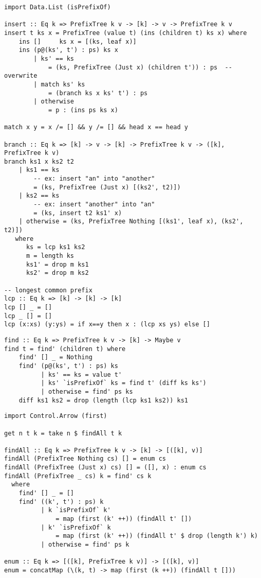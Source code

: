 \documentclass{article}
\begin{document}
\lstset{language=Haskell}
\begin{lstlisting}[caption=Prefix tree insertion]
import Data.List (isPrefixOf)

insert :: Eq k => PrefixTree k v -> [k] -> v -> PrefixTree k v
insert t ks x = PrefixTree (value t) (ins (children t) ks x) where
    ins []     ks x = [(ks, leaf x)]
    ins (p@(ks', t') : ps) ks x
        | ks' == ks
            = (ks, PrefixTree (Just x) (children t')) : ps  -- overwrite
        | match ks' ks
            = (branch ks x ks' t') : ps
        | otherwise
            = p : (ins ps ks x)

match x y = x /= [] && y /= [] && head x == head y

branch :: Eq k => [k] -> v -> [k] -> PrefixTree k v -> ([k], PrefixTree k v)
branch ks1 x ks2 t2
    | ks1 == ks
        -- ex: insert "an" into "another"
        = (ks, PrefixTree (Just x) [(ks2', t2)])
    | ks2 == ks
        -- ex: insert "another" into "an"
        = (ks, insert t2 ks1' x)
    | otherwise = (ks, PrefixTree Nothing [(ks1', leaf x), (ks2', t2)])
   where
      ks = lcp ks1 ks2
      m = length ks
      ks1' = drop m ks1
      ks2' = drop m ks2

-- longest common prefix
lcp :: Eq k => [k] -> [k] -> [k]
lcp [] _ = []
lcp _ [] = []
lcp (x:xs) (y:ys) = if x==y then x : (lcp xs ys) else []
\end{lstlisting}

\lstset{language=Haskell}
\begin{lstlisting}[caption=Alphabetic prefix tree lookup]
find :: Eq k => PrefixTree k v -> [k] -> Maybe v
find t = find' (children t) where
    find' [] _ = Nothing
    find' (p@(ks', t') : ps) ks
          | ks' == ks = value t'
          | ks' `isPrefixOf` ks = find t' (diff ks ks')
          | otherwise = find' ps ks
    diff ks1 ks2 = drop (length (lcp ks1 ks2)) ks1
\end{lstlisting}

\lstset{language=Haskell}
\begin{lstlisting}[caption=Look up the prefix tree up to $n$ candidates]
import Control.Arrow (first)

get n t k = take n $ findAll t k

findAll :: Eq k => PrefixTree k v -> [k] -> [([k], v)]
findAll (PrefixTree Nothing cs) [] = enum cs
findAll (PrefixTree (Just x) cs) [] = ([], x) : enum cs
findAll (PrefixTree _ cs) k = find' cs k
  where
    find' [] _ = []
    find' ((k', t') : ps) k
          | k `isPrefixOf` k'
              = map (first (k' ++)) (findAll t' [])
          | k' `isPrefixOf` k
              = map (first (k' ++)) (findAll t' $ drop (length k') k)
          | otherwise = find' ps k

enum :: Eq k => [([k], PrefixTree k v)] -> [([k], v)]
enum = concatMap (\(k, t) -> map (first (k ++)) (findAll t []))
\end{lstlisting}
\end{document}
